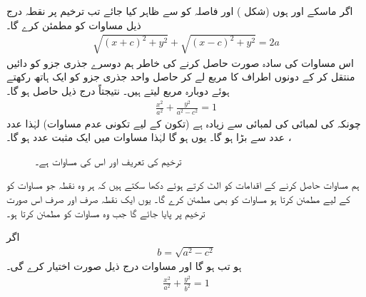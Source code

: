 اگر ماسکے  اور  ہوں (شکل ) اور فاصلہ  کو  سے ظاہر کیا جائے تب ترخیم پر نقطہ  درج ذیل مساوات کو مطمئن کرے گا۔
\begin{align*}
\sqrt{(x+c)^2+y^2}+\sqrt{(x-c)^2+y^2}=2a
\end{align*}
اس مساوات کی سادہ صورت حاصل کرنے کی خاطر ہم دوسرے جذری جزو کو دائیں منتقل کر کے دونوں اطراف کا مربع لے کر حاصل واحد جذری جزو کو ایک ہاتھ رکھتے ہوئے دوبارہ مربع لیتے ہیں۔ نتیجتاً درج ذیل حاصل ہو گا۔ 
\begin{align}\label{مساوات_مخروط_ترخیم_الف}
\frac{x^2}{a^2}+\frac{y^2}{a^2-c^2}=1
\end{align} 
چونکہ  کی لمبائی  کی لمبائی سے زیادہ ہے (تکون  کے لیے تکونی عدم مساوات) لہٰذا عدد ،   عدد  سے بڑا ہو گا۔ یوں  ہو گا لہٰذا  مساوات  میں  ایک مثبت عدد ہو گا۔

\begin{figure}
\centering
{}
\caption
{ترخیم کی تعریف اور اس کی مساوات   ہے۔}
\label{شکل_مخروط_مساوات_ترخیم}
\end{figure}


ہم مساوات  حاصل کرنے کے اقدامات کو الٹ کرتے ہوئے دکھا سکتے ہیں کہ ہر وہ نقطہ جو مساوات   کو  کے لیے مطمئن کرتا ہو  مساوات  کو بھی مطمئن کرے گا۔ یوں ایک نقطہ صرف اور صرف اس صورت ترخیم پر پایا جائے گا  جب   وہ مساوات  کو مطمئن کرتا ہو۔

اگر
\begin{align}\label{مساوات_مخروط_ترخیم_ب}
b=\sqrt{a^2-c^2}
\end{align}
ہو تب  ہو گا اور مساوات  درج ذیل صورت اختیار کرے گی۔
\begin{align}\label{مساوات_مخروط_ترخیم_پ}
\frac{x^2}{a^2}+\frac{y^2}{b^2}=1
\end{align}

